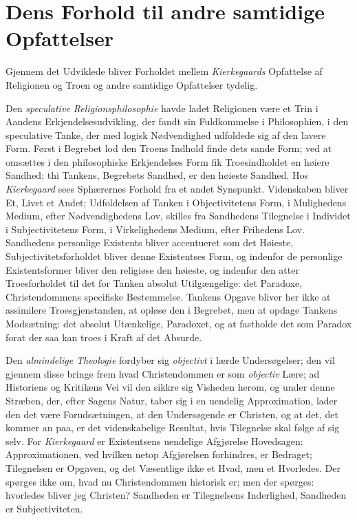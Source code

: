 \documentclass[12pt,a4paper]{book}
\newcommand{\opage}[1]{\marginnote{\footnotesize\textit{[#1]}}}
\begin{document}
\section{Dens Forhold til andre samtidige Opfattelser}
\label{sec:samtidige}

Gjennem det Udviklede bliver Forholdet mellem \emph{Kierkegaards} Opfattelse
af Religionen og Troen og andre samtidige Opfattelser tydelig.

Den \emph{speculative Religionsphilosophie} havde ladet Religionen være et
Trin i Aandens Erkjendelsesudvikling, der fandt sin Fuldkommelse i
Philosophien, i den speculative Tanke, der med logisk Nødvendighed
udfoldede sig af den lavere Form. Først i Begrebet lod den Troens
Indhold finde dets sande Form; ved at omsættes i den philosophiske
Erkjendelses Form fik Troesindholdet en høiere Sandhed; thi Tankens,
Begrebets Sandhed, er den høieste Sandhed. Hos \emph{Kierkegaard} sees
Sphærernes Forhold fra et andet Synspunkt. Videnskaben bliver Et,
Livet et Andet; Udfoldelsen af Tanken i Objectivitetens Form, i
Mulighedens Medium, efter Nødvendighedens Lov, skilles fra Sandhedens
\opage{124}Tilegnelse i Individet i Subjectivitetens Form, i Virkelighedens
Medium, efter Frihedens Lov. Sandhedens personlige Existents bliver
accentueret som det Høieste, Subjectivitetsforholdet bliver denne
Existentses Form, og indenfor de personlige Existentsformer bliver den
religiøse den høieste, og indenfor den atter Troesforholdet til det
for Tanken absolut Utilgængelige: det Paradoxe, Christendommens
specifiske Bestemmelse. Tankens Opgave bliver her ikke at assimilere
Troesgjenstanden, at opløse den i Begrebet, men at opdage Tankens
Modsætning: det absolut Utænkelige, Paradoxet, og at fastholde det
som Paradox forat der saa kan troes i Kraft af det Absurde.

Den \emph{almindelige Theologie} fordyber sig \emph{objectivt} i lærde
Undersøgelser; den vil gjennem disse bringe frem hvad Christendommen
er som \emph{objectiv} Lære; ad Historiens og Kritikens Vei vil den sikkre
sig Visheden herom, og under denne Stræben, der, efter Sagens Natur,
taber sig i en uendelig Approximation, lader den det være
Forudsætningen, at den Undersøgende er Christen, og at det, det
kommer an paa, er det videnskabelige Resultat, hvis Tilegnelse skal
følge af sig selv. For \emph{Kierkegaard} er Existentsens uendelige
Afgjørelse Hovedsagen: Approximationen, ved hvilken netop Afgjørelsen
forhindres, er Bedraget; Tilegnelsen er Opgaven, og det Væsentlige
ikke et Hvad, men et Hvorledes. Der spørges ikke om, hvad nu
Christendommen historisk er; men der spørges: hvorledes bliver jeg
Christen? Sandheden er Tilegnelsens Inderlighed, Sandheden er
Subjectiviteten.
\end{document}
